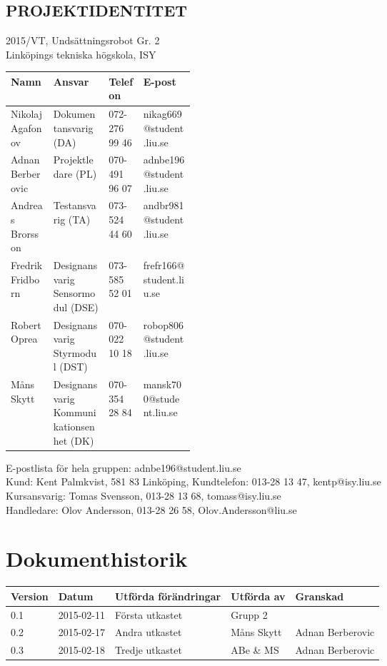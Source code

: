 \documentclass[11pt]{article}
\begin{document}
\pagebreak
\begin{center}

\section*{PROJEKTIDENTITET}
2015/VT, Undsättningsrobot Gr. 2
\\
Linköpings tekniska högskola, ISY
\\[0.5in]
\begin{table}[h]
\begin{tabular}{|l|p{0.3\linewidth}|l|l|} \hline
Namn & Ansvar & Telefon & E-post \\[0.1in] \hline
Nikolaj Agafonov & Dokumentansvarig (DA) & 072-276 99 46 & nikag669@student.liu.se \\ \hline
Adnan Berberovic & Projektledare (PL) & 070-491 96 07 & adnbe196@student.liu.se \\ \hline
Andreas Brorsson & Testansvarig (TA) & 073-524 44 60 & andbr981@student.liu.se \\ \hline
Fredrik Fridborn & Designansvarig Sensormodul (DSE) & 073-585 52 01 & frefr166@student.liu.se \\ \hline
Robert Oprea & Designansvarig Styrmodul (DST) & 070-022 10 18 & robop806@student.liu.se \\ \hline
Måns Skytt & Designansvarig Kommunikationsenhet (DK) & 070-354 28 84 & mansk700@student.liu.se \\ \hline
\end{tabular}
\end{table}

E-postlista för hela gruppen: adnbe196@student.liu.se
\\[1in]
Kund: Kent Palmkvist, 581 83 Linköping,
Kundtelefon: 013-28 13 47, kentp@isy.liu.se
\\[1in]
Kursansvarig: Tomas Svensson, 013-28 13 68, tomass@isy.liu.se
\\
Handledare: Olov Andersson, 013-28 26 58, Olov.Andersson@liu.se
\end{center}
\pagebreak

\tableofcontents

\pagebreak

\section*{Dokumenthistorik}
\begin{table}[h]
\begin{tabular}{|l|l|l|l|l|} \hline

Version & 
Datum & 
Utförda förändringar & 
Utförda av & 
Granskad \\[0.1in] \hline
0.1 &
2015-02-11 & 
Första utkastet & 
Grupp 2 & 
\\ \hline

0.2 &
2015-02-17 & 
Andra utkastet & 
Måns Skytt & 
Adnan Berberovic\\ \hline

0.3 &
2015-02-18 &
Tredje utkastet &
ABe \& MS &
Adnan Berberovic \\ \hline

\end{tabular}
\end{table}
\end{document}
